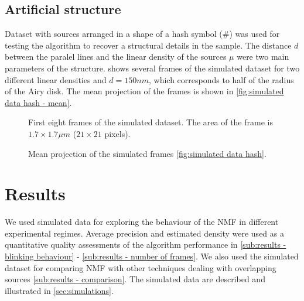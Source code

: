 \clearpage
\subsection{Artificial structure\label{sub:Simul hash}}
Dataset with sources arranged in a shape of a hash symbol (\#) was used for testing the algorithm to recover a structural details in the sample. The distance $d$ between the paralel lines and the linear density of the sources $\mu$ were two main parameters of the structure.  shows several frames of the simulated dataset for two different linear densities and $d=150\unit{nm}$, which corresponds to half of the radius of the Airy disk. The mean projection of the frames is shown in \autoref{fig:simulated data hash - mean}.
%
\begin{figure}[!htb]	
	\newcommand{\widthfig}{1\textwidth}
	\centering	
	
	
	\caption{First eight frames of the simulated dataset. The area of the frame is $1.7\times1.7\unit{\mu m}$ ($21\times21$ pixels).}
	\label{fig:simulated data hash}
\end{figure} 
%
\begin{figure}[!htb]	
	\newcommand{\widthfig}{.4\textwidth}
	\centering	
	\hspace{.3cm}	
	\caption{Mean projection of the simulated frames \autoref{fig:simulated data hash}.}
	\label{fig:simulated data hash - mean}
\end{figure} 

\clearpage
\section{Results \label{sec:results}}
We used simulated data for exploring the behaviour of the NMF in different experimental regimes. Average precision and estimated density were used as a quantitative quality assessments of the algorithm performance in  \autoref{sub:results - blinking behaviour} - \ref{sub:results - number of frames}. We also used the simulated dataset for comparing NMF with other techniques dealing with overlapping sources \autoref{sub:results - comparison}. The simulated data are described and illustrated in \autoref{sec:simulations}. 

